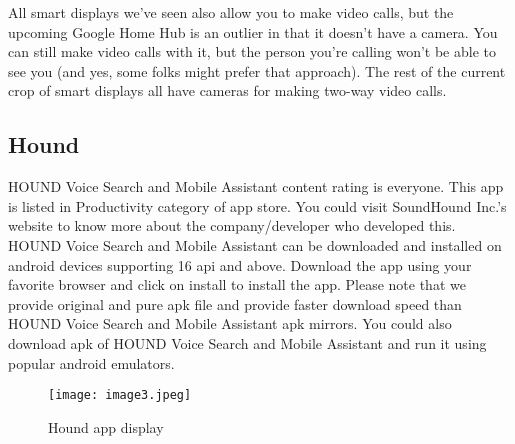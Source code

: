 \documentclass[12pt,a4paper]{article}
\begin{document}
\par All smart displays we've seen also allow you to make video calls, but the upcoming Google Home Hub is an outlier in that it doesn't have a camera. You can still make video calls with it, but the person you're calling won't be able to see you (and yes, some folks might prefer that approach). The rest of the current crop of smart displays all have cameras for making two-way video calls.


\newpage

\begin{center}
\section{Hound}
\end{center}
\par HOUND Voice Search and Mobile Assistant content rating is everyone. This app is listed in Productivity category of app store. You could visit SoundHound Inc.'s website to know more about the company/developer who developed this. HOUND Voice Search and Mobile Assistant can be downloaded and installed on android devices supporting 16 api and above. Download the app using your favorite browser and click on install to install the app. Please note that we provide original and pure apk file and provide faster download speed than HOUND Voice Search and Mobile Assistant apk mirrors. You could also download apk of HOUND Voice Search and Mobile Assistant and run it using popular android emulators.
\begin{figure}[h]
	\centering
	\texttt{[image: image3.jpeg]}
	\caption{Hound app display}
\end{figure}
\end{document}
